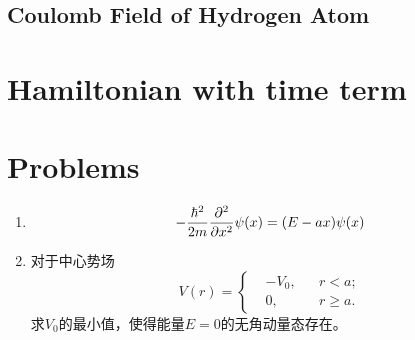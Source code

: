 \subsection{Coulomb Field of Hydrogen Atom}
\section{Hamiltonian with time term}
\newpage 
\section*{Problems}
\begin{enumerate}
    \item \begin{equation}
        -\frac{\hbar^2}{2m}\frac{\partial^2 }{\partial x^2}\psi(x)=(E-ax)\psi(x)
    \end{equation}
    \item 对于中心势场
    \begin{equation}
        V(r)=\left\lbrace
        \begin{aligned}
            &-V_0, && r<a;\\
            &0, && r\ge a.
        \end{aligned}\right.
    \end{equation}
    求$V_0$的最小值，使得能量$E=0$的无角动量态存在。
\end{enumerate}

\newpage
